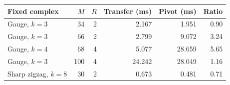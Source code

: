\begin{center}\small
\begin{tabular}{lrrrrr}
\toprule
Fixed complex & $M$ & $R$ & Transfer (ms) & Pivot (ms) & Ratio\\\midrule
Gauge, $k=3$ & 34 & 2 & 2.167 & 1.951 & 0.90\\
Gauge, $k=3$ & 66 & 2 & 2.799 & 9.072 & 3.24\\
Gauge, $k=4$ & 68 & 4 & 5.077 & 28.659 & 5.65\\
Gauge, $k=3$ & 100 & 4 & 24.242 & 28.049 & 1.16\\
Sharp zigzag, $k=8$ & 30 & 2 & 0.673 & 0.481 & 0.71\\
\bottomrule
\end{tabular}
\end{center}

